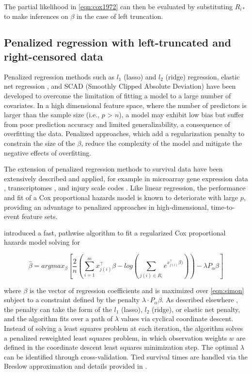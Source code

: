 \documentclass[11pt,final,fleqn]{article}\usepackage[]{graphicx}\usepackage[]{color}
\theoremstyle{plain}
\begin{document}
The partial likelihood in \autoref{eqn:cox1972} can then be evaluated by substituting $R_{i\ast}$ to make inferences on $\beta$ in the case of left truncation. 

\subsection{Penalized regression with left-truncated and right-censored data}
Penalized regression methods such as $l_1$ (lasso) \citep{tibshirani1996regression} and $l_2$ (ridge) \citep{tikhonov1963ridge} regression, elastic net regression \citep{zou2005regularization}, and SCAD (Smoothly Clipped Absolute Deviation) \citep{xie2009scad} have been developed to overcome the limitation of fitting a model to a large number of covariates. In a high dimensional feature space, where the number of predictors is larger than the sample size (i.e., $p$ > $n$), a model may exhibit low bias but suffer from poor prediction accuracy and limited generalizability, a consequence of overfitting the data. Penalized approaches, which add a regularization penalty to constrain the size of the $\beta$, reduce the complexity of the model and mitigate the negative effects of overfitting.

The extension of penalized regression methods to survival data have been extensively described and applied, for example in microarray gene expression data \citep{gui2005penalized}, transcriptomes \citep{wu2011penalized}, and injury scale codes \citep{mittal2013penalized}. Like linear regression, the performance and fit of a Cox proportional hazards model is known to deteriorate with large $p$, providing an advantage to penalized approaches in high-dimensional, time-to-event feature sets.

\citet{simon2011regularization} introduced a fast, pathwise algorithm to fit a regularized Cox proportional hazards model solving for 

\begin{equation} \label{eqn:simon}
\hat{\beta} = argmax_{\beta}  \left[ \frac{2}{n} \left( \sum_{i=1}^m x_{j(i)}^\intercal\beta - log\left(\sum_{j(i)\in R_i}  e^{x_{j(i)}^\intercal\beta)}\right) \right)  - \lambda P_{\alpha}\beta  \right] 
\end{equation}

where $\beta$ is the vector of regression coefficients and is maximized over \autoref{eqn:simon} subject to a constraint defined by the penalty $\lambda \cdot P_{\alpha}\beta$. As described elsewhere \citep{simon2011regularization}, the penalty can take the form of the $l_1$ (lasso), $l_2$ (ridge), or elastic net penalty,  and the algorithm fits over a path of $\lambda$ values via cyclical coordinate descent. Instead of solving a least squares problem at each iteration, the algorithm solves a penalized reweighted least squares problem, in which observation weights $w$ are defined in the coordinate descent least squares minimization step. The optimal $\lambda$ can be identified through cross-validation. Tied survival times are handled via the Breslow approximation \citep{breslow1972} and details provided in \citep{simon2011regularization}.
\end{document}
